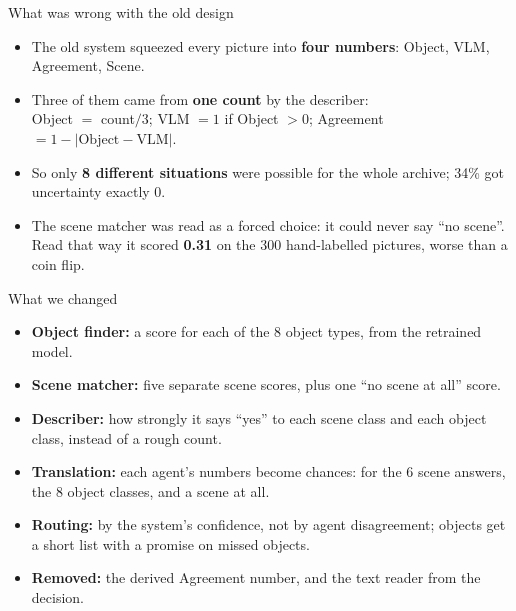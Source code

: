 \documentclass[aspectratio=169,11pt]{beamer}
\newcommand{\remark}[1]{\par\vspace{0.35cm}{\small\textcolor{grey}{#1}}}
\begin{document}
\begin{frame}{What was wrong with the old design}
\begin{itemize}\setlength\itemsep{9pt}
  \item The old system squeezed every picture into \textbf{four numbers}: Object, VLM, Agreement, Scene.
  \item Three of them came from \textbf{one count} by the describer:\\
        Object $=$ count$/3$; VLM $= 1$ if Object $> 0$; Agreement $= 1 - |\text{Object} - \text{VLM}|$.
  \item So only \textbf{8 different situations} were possible for the whole archive; 34\% got uncertainty exactly 0.
  \item The scene matcher was read as a forced choice: it could never say ``no scene''. Read that way it scored \textbf{0.31} on the 300 hand-labelled pictures, worse than a coin flip.
\end{itemize}
\remark{Like four witnesses where three only repeat the first one: their agreement tells you nothing new.}
\end{frame}

\begin{frame}{What we changed}
\begin{itemize}\setlength\itemsep{8pt}
  \item \textbf{Object finder:} a score for each of the 8 object types, from the retrained model.
  \item \textbf{Scene matcher:} five separate scene scores, plus one ``no scene at all'' score.
  \item \textbf{Describer:} how strongly it says ``yes'' to each scene class and each object class, instead of a rough count.
  \item \textbf{Translation:} each agent's numbers become chances: for the 6 scene answers, the 8 object classes, and a scene at all.
  \item \textbf{Routing:} by the system's confidence, not by agent disagreement; objects get a short list with a promise on missed objects.
  \item \textbf{Removed:} the derived Agreement number, and the text reader from the decision.
\end{itemize}
\end{frame}
\end{document}
